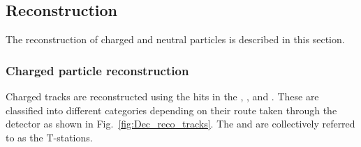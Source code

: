 \subsection{Reconstruction}
The reconstruction of charged and neutral particles is described in this section. 

\subsubsection{Charged particle reconstruction}
Charged tracks are reconstructed using the hits in the \velo, \ttracker, \intr and \ot. These are classified into different categories depending on their route taken through the detector as shown in Fig.~\ref{fig:Dec_reco_tracks}. The \intr and \ot are collectively referred to as the T-stations. 

